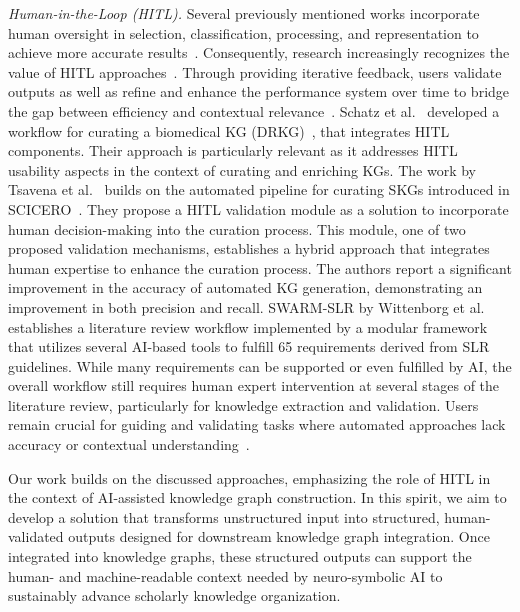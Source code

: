 \documentclass[runningheads]{llncs}
\begin{document}
\noindent
\textit{Human-in-the-Loop (HITL).}
Several previously mentioned works incorporate human oversight in selection, classification, processing, and representation to achieve more accurate results~\cite{alshami_harnessing_2023,Auer.2025,bacinger_system_2022,ye_hybrid_2024}.
Consequently, research increasingly recognizes the value of HITL approaches~\cite{kommineni_human_2024}.
Through providing iterative feedback, users validate outputs as well as refine and enhance the performance system over time to bridge the gap between efficiency and contextual relevance~\cite{dalvi_mishra_towards_2022}.
Schatz et al.~\cite{schatz_workflow_2022} developed a workflow for curating a biomedical KG (DRKG)~\cite{ioannidis_drkg_2020}, that integrates HITL components. 
Their approach is particularly relevant as it addresses HITL usability aspects in the context of curating and enriching KGs.
The work by Tsavena et al.~\cite{tsaneva_enhancing_2024} builds on the automated pipeline for curating SKGs introduced in SCICERO~\cite{dessi_scicero_2022}.
They propose a HITL validation module as a solution to incorporate human decision-making into the curation process.
This module, one of two proposed validation mechanisms, establishes a hybrid approach that integrates human expertise to enhance the curation process.
The authors report a significant improvement in the accuracy of automated KG generation, demonstrating an improvement in both precision and recall.
%
SWARM-SLR by Wittenborg et al.~\cite{wittenborg_swarm-slr_2024} establishes a literature review workflow implemented by a modular framework that utilizes several AI-based tools to fulfill 65 requirements derived from SLR guidelines.
While many requirements can be supported or even fulfilled by AI, the overall workflow still requires human expert intervention at several stages of the literature review, particularly for knowledge extraction and validation.
Users remain crucial for guiding and validating tasks where automated approaches lack accuracy or contextual understanding~\cite{mosqueira-rey_human---loop_2023}.
%

Our work builds on the discussed approaches, emphasizing the role of HITL in the context of AI-assisted knowledge graph construction.
In this spirit, we aim to develop a solution that transforms unstructured input into structured, human-validated outputs designed for downstream knowledge graph integration. Once integrated into knowledge graphs, these structured outputs can support the human- and machine-readable context needed by neuro-symbolic AI to sustainably advance scholarly knowledge organization.
\end{document}
